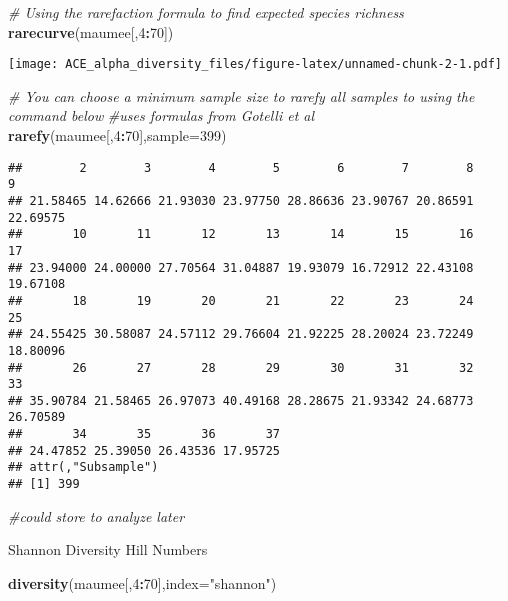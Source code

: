 \documentclass[]{article}
\newenvironment{Shaded}{\begin{snugshade}}{\end{snugshade}}
\newcommand{\KeywordTok}[1]{\textcolor[rgb]{0.13,0.29,0.53}{\textbf{#1}}}
\newcommand{\DataTypeTok}[1]{\textcolor[rgb]{0.13,0.29,0.53}{#1}}
\newcommand{\DecValTok}[1]{\textcolor[rgb]{0.00,0.00,0.81}{#1}}
\newcommand{\StringTok}[1]{\textcolor[rgb]{0.31,0.60,0.02}{#1}}
\newcommand{\CommentTok}[1]{\textcolor[rgb]{0.56,0.35,0.01}{\textit{#1}}}
\newcommand{\OperatorTok}[1]{\textcolor[rgb]{0.81,0.36,0.00}{\textbf{#1}}}
\newcommand{\NormalTok}[1]{#1}
\begin{document}
\begin{Shaded}
\begin{Highlighting}[]
\CommentTok{# Using the rarefaction formula to find expected species richness}
\KeywordTok{rarecurve}\NormalTok{(maumee[,}\DecValTok{4}\OperatorTok{:}\DecValTok{70}\NormalTok{])}
\end{Highlighting}
\end{Shaded}

\texttt{[image: ACE\_alpha\_diversity\_files/figure-latex/unnamed-chunk-2-1.pdf]}

\begin{Shaded}
\begin{Highlighting}[]
\CommentTok{# You can choose a minimum sample size to rarefy all samples to using the command below}
\CommentTok{#uses formulas from Gotelli et al}
\KeywordTok{rarefy}\NormalTok{(maumee[,}\DecValTok{4}\OperatorTok{:}\DecValTok{70}\NormalTok{],}\DataTypeTok{sample=}\DecValTok{399}\NormalTok{)}
\end{Highlighting}
\end{Shaded}

\begin{verbatim}
##        2        3        4        5        6        7        8        9 
## 21.58465 14.62666 21.93030 23.97750 28.86636 23.90767 20.86591 22.69575 
##       10       11       12       13       14       15       16       17 
## 23.94000 24.00000 27.70564 31.04887 19.93079 16.72912 22.43108 19.67108 
##       18       19       20       21       22       23       24       25 
## 24.55425 30.58087 24.57112 29.76604 21.92225 28.20024 23.72249 18.80096 
##       26       27       28       29       30       31       32       33 
## 35.90784 21.58465 26.97073 40.49168 28.28675 21.93342 24.68773 26.70589 
##       34       35       36       37 
## 24.47852 25.39050 26.43536 17.95725 
## attr(,"Subsample")
## [1] 399
\end{verbatim}

\begin{Shaded}
\begin{Highlighting}[]
\CommentTok{#could store to analyze later}
\end{Highlighting}
\end{Shaded}

Shannon Diversity Hill Numbers

\begin{Shaded}
\begin{Highlighting}[]
\KeywordTok{diversity}\NormalTok{(maumee[,}\DecValTok{4}\OperatorTok{:}\DecValTok{70}\NormalTok{],}\DataTypeTok{index=}\StringTok{"shannon"}\NormalTok{)  }
\end{Highlighting}
\end{Shaded}
\end{document}
